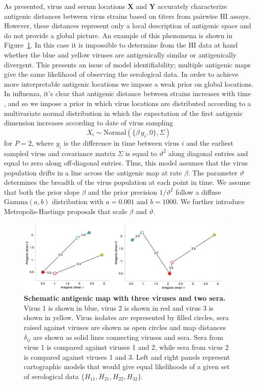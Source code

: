 \documentclass[11pt,oneside,letterpaper]{article}
\newcommand{\driftsd}{\vartheta}					%
\begin{document}
As presented, virus and serum locations $\mathbf{X}$ and $\mathbf{Y}$ accurately characterize antigenic distances between virus strains based on titers from pairwise HI assays.
However, these distances represent only a local description of antigenic space and do not provide a global picture.
An example of this phenomena is shown in Figure~\ref{schematic_map}.
In this case it is impossible to determine from the HI data at hand whether the blue and yellow viruses are antigenically similar or antigenically divergent. 
This presents an issue of model identifiability; multiple antigenic maps give the same likelihood of observing the serological data.
In order to achieve more interpretable antigenic locations we impose a weak prior on global locations.
In influenza, it's clear that antigenic distance between strains increases with time \cite{Smith04,Cai10}, and so we impose a prior in which virus locations are distributed according to a multivariate normal distribution in which the expectation of the first antigenic dimension increases according to date of virus sampling
\begin{equation} 
	X_{i} \sim \mbox{Normal}( \{\beta \, y_i, 0\}, \Sigma )
\end{equation}
for $P=2$, where $y_i$ is the difference in time between virus $i$ and the earliest sampled virus and covariance matrix $\Sigma$ is equal to $\driftsd^2$ along diagonal entries and equal to zero along off-diagonal entries.
Thus, this model assumes that the virus population drifts in a line across the antigenic map at rate $\beta$.
The parameter $\driftsd$ determines the breadth of the virus population at each point in time.
We assume that both the prior slope $\beta$ and the prior precision $1/\driftsd^2$ follow a diffuse $\mbox{Gamma}(a, b)$ distribution with $a=0.001$ and $b=1000$.
We further introduce Metropolis-Hastings proposals that scale $\beta$ and $\driftsd$.

\begin{figure}[tb]
	\centering		
	\includegraphics[width=0.95\textwidth]{figures/schematic_map}
	\caption{\textbf{Schematic antigenic map with three viruses and two sera.} 
	Virus 1 is shown in blue, virus 2 is shown in red and virus 3 is shown in yellow.
	Virus isolates are represented by filled circles, sera raised against viruses are shown as open circles and map distances $\delta_{ij}$ are shown as solid lines connecting viruses and sera.
	Sera from virus 1 is compared against viruses 1 and 2, while sera from virus 2 is compared against viruses 1 and 3.
	Left and right panels represent cartographic models that would give equal likelihoods of a given set of serological data $\{H_{11},H_{21},H_{22},H_{32}\}$.
	} 
	\label{schematic_map} 
\end{figure}
\end{document}

